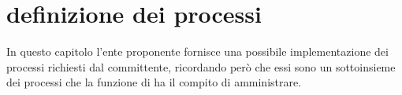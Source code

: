 %
%
\chapter[Definizione dei processi]{definizione dei processi}
\label{prc}
In questo capitolo l'ente proponente fornisce una possibile implementazione dei processi richiesti dal committente, ricordando però che essi sono un sottoinsieme dei processi che la funzione di  ha il compito di amministrare.

